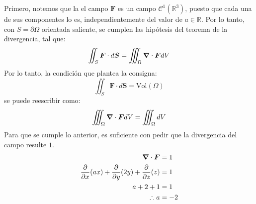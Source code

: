\begin{solution}
    Primero, notemos que la el campo $\boldsymbol{F}$ es un campo $\mathcal{C}^1(\mathbb{R}^3)$, puesto que
    cada una de sus componentes lo es, independientemente del valor de $a \in \mathbb{R}$.
    Por lo tanto, con $S = \partial \Omega$ orientada saliente, se cumplen las hipótesis del
    teorema de la divergencia, tal que:
    \begin{equation*}
        \iint_S \boldsymbol{F} \cdot d\boldsymbol{S} = \iiint_\Omega \grad \cdot \boldsymbol{F} dV
    \end{equation*}
    Por lo tanto, la condición que plantea la consigna:
    \begin{equation*}
        \iint_S \boldsymbol{F} \cdot d\boldsymbol{S} = \text{Vol}(\Omega)
    \end{equation*}
    se puede reescribir como:
    \begin{equation*}
        \iiint_\Omega \grad \cdot \boldsymbol{F} dV = \iiint_\Omega dV
    \end{equation*}
    Para que se cumple lo anterior, es suficiente con pedir que la divergencia del campo resulte $1$.
    \begin{align*}
        \grad \cdot \boldsymbol{F} &= 1 \\
        \frac{\partial}{\partial x}(ax) + \frac{\partial}{\partial y}(2y) + \frac{\partial}{\partial z}(z) &= 1 \\
        a + 2 + 1 &= 1 \\
        \therefore a &= -2
    \end{align*}
\end{solution}